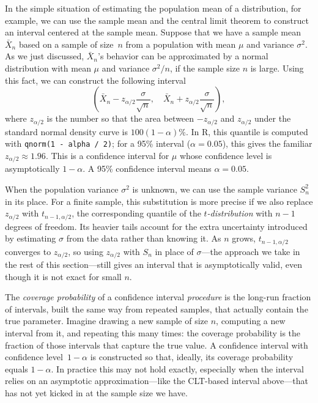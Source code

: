In the simple situation of estimating the population mean of a
distribution, for example, we can use the sample mean and the central
limit theorem to construct an interval centered at the sample mean.
Suppose that we have a sample mean $\bar{X}_n$ based on a sample of
size~$n$ from a population with mean $\mu$ and variance $\sigma^2$. As
we just discussed, $\bar{X}_n$'s behavior can be approximated by a
normal distribution with mean $\mu$ and variance $\sigma^2/n$, if the
sample size $n$ is large. Using this fact, we can construct the
following interval
\[
\left(\bar{X}_n - z_{\alpha/2} \frac{\sigma}{\sqrt{n}}, \quad
\bar{X}_n + z_{\alpha/2} \frac{\sigma}{\sqrt{n}}\right),
\]
where $z_{\alpha/2}$ is the number so that the area between
$-z_{\alpha/2}$ and $z_{\alpha/2}$ under the standard normal density
curve is $100(1-\alpha)\%$. In R, this quantile is computed with
\lstinline{qnorm(1 - alpha / 2)}; for a 95\% interval ($\alpha = 0.05$),
this gives the familiar $z_{\alpha/2} \approx 1.96$. This is a confidence
interval for $\mu$ whose confidence level is asymptotically $1 - \alpha$.
A 95\% confidence interval means $\alpha = 0.05$.


When the population variance $\sigma^2$ is unknown, we can use the
sample variance $S_n^2$ in its place. For a finite sample, this
substitution is more precise if we also replace $z_{\alpha/2}$ with
$t_{n-1,\alpha/2}$, the corresponding quantile of the
\emph{$t$-distribution} with $n-1$ degrees of
freedom. Its heavier tails account for the extra uncertainty introduced
by estimating $\sigma$ from the data rather than knowing it. As $n$
grows, $t_{n-1,\alpha/2}$ converges to $z_{\alpha/2}$, so using
$z_{\alpha/2}$ with $S_n$ in place of $\sigma$---the approach we take
in the rest of this section---still gives an interval that is
asymptotically valid, even though it is not exact for small $n$.


The \emph{coverage probability} of a
confidence interval \emph{procedure} is the long-run fraction of
intervals, built the same way from repeated samples, that actually
contain the true parameter. Imagine drawing a new sample of size $n$,
computing a new interval from it, and repeating this many times: the
coverage probability is the fraction of those intervals that capture
the true value. A confidence interval with confidence level~$1-\alpha$
is constructed so that, ideally, its coverage probability equals
$1-\alpha$. In practice this may not hold exactly, especially when the
interval relies on an asymptotic approximation---like the CLT-based
interval above---that has not yet kicked in at the sample size we have.


